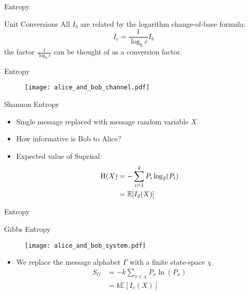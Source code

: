 \begin{frame}{Entropy}
\begin{block}{Unit Conversions}
	All $I_b$ are related by the logarithm change-of-base formula:
	\begin{equation*}
	I_c = \frac{1}{\log_b c} I_b
	\end{equation*}
	the factor $\frac{1}{\log_b c}$ can be thought of as a conversion factor.
\end{block}
\end{frame}




\begin{frame}{Entropy}
\begin{figure}
\texttt{[image: alice\_and\_bob\_channel.pdf]}
\end{figure}
\begin{block}{Shannon Entropy}
\begin{itemize}
	\item Single message replaced with message random variable $X$
	\item How informative is Bob to Alice?
	\item Expected value of Suprisal:
	{\small
	\begin{align*}
		\operatorname{H}(X) &= - \sum_{i=1}^2 P_{i} \log_2(P_{i})\\
		&= \mathbb{E}[I_2(X)]
	\end{align*}}
\end{itemize}
\end{block}
\end{frame}



\begin{frame}{Entropy}
\begin{block}{Gibbs Entropy}
\begin{figure}
\texttt{[image: alice\_and\_bob\_system.pdf]}
\end{figure}
\begin{itemize}
	\item We replace the message alphabet $\Gamma$ with a finite state-space $\chi$
	\begin{align*}
		S_G &= -k \sum_{x\in\chi}P_x \ln(P_x)\\
		&= k \mathbb{E}[I_e(X)]
	\end{align*}
\end{itemize}
\end{block}
\end{frame}

